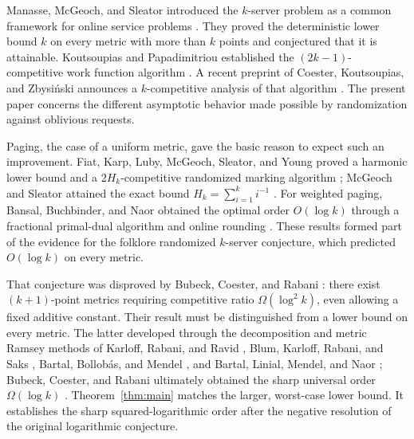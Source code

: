 Manasse, McGeoch, and Sleator introduced the \(k\)-server problem as a
common framework for online service problems
\cite{MMS88,MMS90}. They proved the deterministic lower bound \(k\)
on every metric with more than \(k\) points and conjectured that it is
attainable. Koutsoupias and Papadimitriou established the
\((2k-1)\)-competitive work function algorithm \cite{KP95}.
A recent preprint of Coester, Koutsoupias, and Zbysiński announces a
\(k\)-competitive analysis of that algorithm \cite{CKZ26}.
The present paper concerns the different asymptotic behavior made
possible by randomization against oblivious requests.

Paging, the case of a uniform metric, gave the basic reason to expect
such an improvement. Fiat, Karp, Luby, McGeoch, Sleator, and Young
proved a harmonic lower bound and a \(2H_k\)-competitive randomized
marking algorithm \cite{FKLMSY91}; McGeoch and Sleator attained the
exact bound \(H_k=\sum_{i=1}^k i^{-1}\) \cite{MS91}.
For weighted paging, Bansal, Buchbinder, and Naor obtained the optimal
order \(O(\log k)\) through a fractional primal-dual algorithm and
online rounding \cite{BBN12}. These results formed part of the
evidence for the folklore randomized \(k\)-server conjecture, which
predicted \(O(\log k)\) on every metric.

That conjecture was disproved by Bubeck, Coester, and Rabani
\cite[Theorem~11 and Proposition~8]{BCR23}: there exist
\((k+1)\)-point metrics requiring
competitive ratio \(\Omega(\log^2 k)\), even allowing a fixed additive
constant. Their result must be distinguished from a lower bound
on every metric. The latter developed through the decomposition and
metric Ramsey methods of Karloff, Rabani, and Ravid \cite{KRR94},
Blum, Karloff, Rabani, and Saks \cite{BKRS00}, Bartal, Bollobás,
and Mendel \cite{BBM06}, and Bartal, Linial, Mendel, and Naor
\cite{BLMN05}; Bubeck, Coester, and Rabani ultimately obtained the
sharp universal order \(\Omega(\log k)\)
\cite[Corollary~20]{BCR23}.
Theorem~\ref{thm:main} matches the larger, worst-case lower bound.
It establishes the sharp squared-logarithmic order after the negative
resolution of the original logarithmic conjecture.

